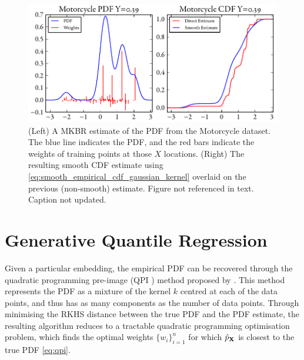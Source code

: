 \documentclass[twoside]{article} \usepackage{aistats2017}
\theoremstyle{definition}
\newcommand{\rv}[1]{{#1}}
\newcommand{\warn}[1]{{\color{red} #1}}
\newcommand{\qpi}{QPI }
\begin{document}
		\begin{figure}
			\begin{center}
				\includegraphics[width=\columnwidth]{figures/cumulativeexamplesmooth}
			\end{center}
			\caption{\small (Left) A MKBR estimate of the PDF from the Motorcycle dataset. The blue line indicates the PDF, and the red bars indicate the weights of training points at those $X$ locations. (Right) The resulting smooth CDF estimate using \eqref{eq:smooth_empirical_cdf_gaussian_kernel} overlaid on the previous (non-smooth) estimate. \warn{Figure not referenced in text. Caption not updated.}}
			\label{fig:cumulativeexamplesmooth}
		\end{figure}

\section{Generative Quantile Regression}
\label{sec:generative_quantile_regression}

	
	Given a particular embedding, the empirical PDF can be recovered through the quadratic programming pre-image (\qpi) method proposed by \cite{McCalman2013}. This method represents the PDF as a mixture of the kernel $k$ centred at each of the data points, and thus has as many components as the number of data points. Through minimising the RKHS distance between the true PDF and the PDF estimate, the resulting algorithm reduces to a tractable quadratic programming optimisation problem, which finds the optimal weights $\{w_{i}\}_{i = 1}^{n}$ for which $\hat{p}_{\bvec{\rv{X}}}$ is closest to the true PDF \eqref{eq:qpi}. 
	
\end{document}
